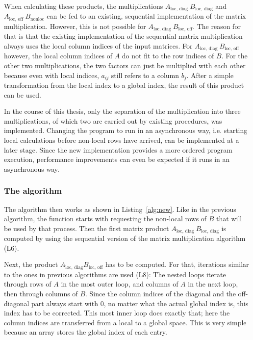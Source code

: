 When calculating these products, the multiplications 
$A_{\textrm{loc, diag~}} B_{\textrm{loc, diag}}$ and $A_{\textrm{loc, off~}} B_{\textrm{nonloc}}$ can be fed to an existing, sequential implementation of the matrix multiplication. However, this is not possible for
$A_{\textrm{loc, diag~}} B_{\textrm{loc, off}}$. The reason for that is that the existing implementation of the sequential matrix multiplication always uses the local column indices of the input matrices. For $A_{\textrm{loc, diag~}} B_{\textrm{loc, off}}$ however, the local column indices of $A$ do not fit to the row indices of $B$. For the other two multiplications, the two factors can just be multiplied with each other because even with local indices, $a_{ij}$ still refers to a column $b_j$. After a simple transformation from the local index to a global index, the result of this product can be used.

In the course of this thesis, only the separation of the multiplication into three multiplications, of which two are carried out by existing procedures, was implemented. Changing the program to run in an asynchronous way, i.e. starting local calculations before non-local rows have arrived, can be implemented at a later stage. %
Since the new implementation provides a more ordered program execution, performance improvements can even be expected if it runs in an asynchronous way.



\subsubsection*{The algorithm}
The algorithm then works as shown in Listing~\ref{alg:new}. Like in the previous algorithm, the function starts with requesting the non-local rows of $B$ that will be used by that process. Then the first matrix product $A_{\textrm{loc, diag~}}B_{\textrm{loc, diag}}$ is computed by using the sequential version of the matrix multiplication algorithm (L6). 

Next, the product $A_{\textrm{loc, diag}} B_{\textrm{loc, off}}$ has to be computed. For that, iterations similar to the ones in previous algorithms are used (L8): The nested loops iterate through rows of $A$ in the most outer loop, and columns of $A$ in the next loop, then through columns of $B$. Since the column indices of the diagonal and the off-diagonal part always start with 0, no matter what the actual global index is, this index has to be corrected. This most inner loop does exactly that; here the column indices are transferred from a local to a global space. This is very simple because an array stores the global index of each entry.

